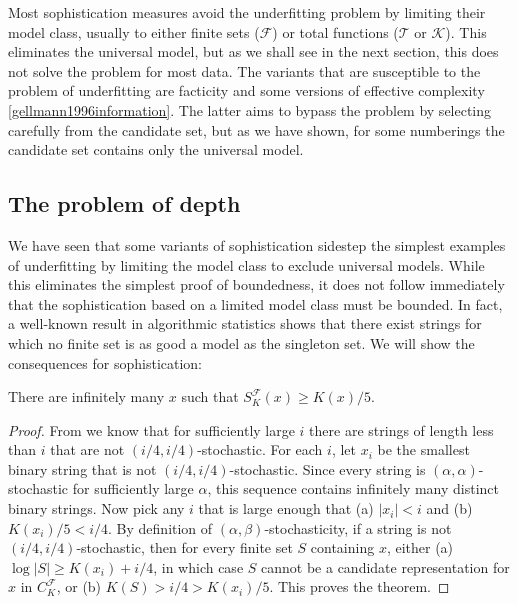 \documentclass{style/llncs}
\newcommand{\T}{\mathscr T}
\newcommand{\F}{\mathscr F}
\newcommand{\K}{\mathscr K}
\begin{document}
Most sophistication measures avoid the underfitting problem by limiting their model class, usually to either finite sets ($\F$) or total functions ($\T$ or $\K$). This eliminates the universal model, but as we shall see in the next section, this does not solve the problem for most data. The variants that are susceptible to the problem of underfitting are facticity \cite{adriaans2012facticity} and some versions of effective complexity \ref{gellmann1996information}. The latter aims to bypass the problem by selecting carefully from the candidate set, but as we have shown, for some numberings the candidate set contains only the universal model.

\subsection{The problem of depth}

We have seen that some variants of sophistication sidestep the simplest examples of underfitting by limiting the model class to exclude universal models. While this eliminates the simplest proof of boundedness, it does not follow immediately that the sophistication based on a limited model class must be bounded. In fact, a well-known result in algorithmic statistics shows that there exist strings for which no finite set is as good a model as the singleton set. We will show the consequences for sophistication:

\begin{theorem}
There are infinitely many $x$ such that $S^\F_K(x) \geq K(x)/5$. \label{theorem:structure-function-is-not-bounded}
\end{theorem}
\begin{proof}
From \cite[Proposition~I.3 (b)]{gacs2001algorithmic} we know that for sufficiently large $i$ there are strings of length less than $i$ that are not $(i/4, i/4)$-stochastic. For each $i$, let $x_i$ be the smallest binary string that is not $(i/4, i/4)$-stochastic. Since every string is $(\alpha,\alpha)$-stochastic for sufficiently large $\alpha$, this sequence contains infinitely many distinct binary strings. Now pick any $i$ that is large enough that (a) $|x_i|<i$ and (b) $K(x_i)/5 < i/4$. By definition of $(\alpha,\beta)$-stochasticity, if a string is not $(i/4,i/4)$-stochastic, then for every finite set $S$ containing $x$, either (a) $\log|S|\ge K(x_i)+i/4$, in which case $S$ cannot be a candidate representation for $x$ in $C^\F_K$, or (b) $K(S)>i/4>K(x_i)/5$. This proves the theorem.
\end{proof}
\end{document}
